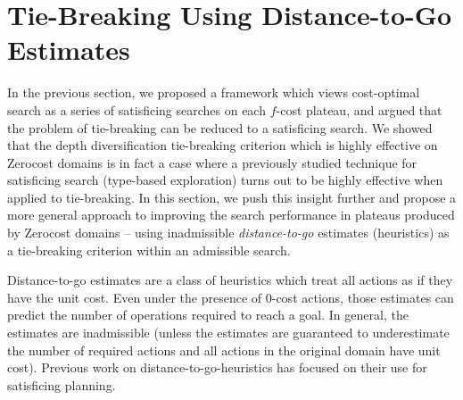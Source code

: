 \section{Tie-Breaking Using Distance-to-Go Estimates}

\label{sec:distance-to-go}
In the previous section, we proposed a framework which views cost-optimal \astar search as a series of satisficing searches on each $f$-cost plateau, and argued that 
the problem of tie-breaking can be reduced to a satisficing search.
We showed that the depth diversification tie-breaking criterion which is highly effective on Zerocost domains is in fact a case where a previously studied technique for satisficing search (type-based exploration) turns out to be highly effective when applied to tie-breaking.
In this section, we push this insight further and propose a more general approach to improving the
search performance in plateaus produced by Zerocost domains --
using inadmissible \emph{distance-to-go} estimates (heuristics) as a tie-breaking criterion within an admissible \astar search.



Distance-to-go estimates are a class of
heuristics which treat all actions as if they have the unit cost. Even under
the presence of 0-cost actions, those estimates can predict the
number of operations required to reach a goal.
In general, the estimates are inadmissible (unless the estimates are guaranteed to underestimate the number of required actions and all actions in the original domain have unit cost).
Previous work on distance-to-go-heuristics has focused on 
their use for satisficing planning.


